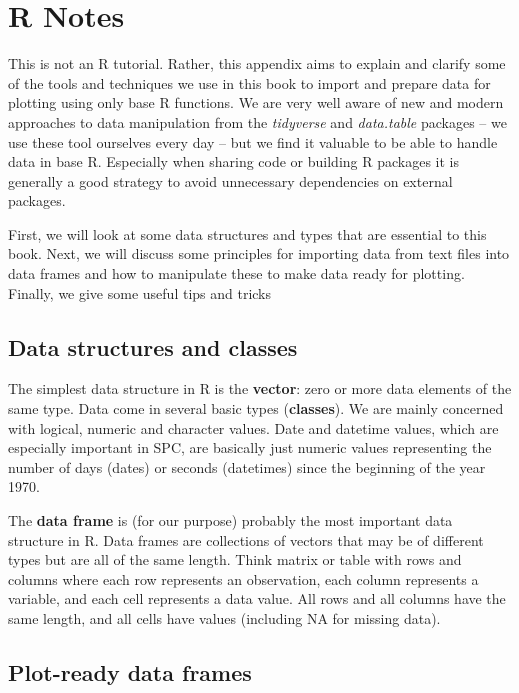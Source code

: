 \documentclass[
]{book}
\begin{document}
\chapter{R Notes}\label{r-notes}

This is not an R tutorial. Rather, this appendix aims to explain and
clarify some of the tools and techniques we use in this book to import
and prepare data for plotting using only base R functions. We are very
well aware of new and modern approaches to data manipulation from the
\emph{tidyverse} and \emph{data.table} packages -- we use these tool
ourselves every day -- but we find it valuable to be able to handle data
in base R. Especially when sharing code or building R packages it is
generally a good strategy to avoid unnecessary dependencies on external
packages.

First, we will look at some data structures and types that are essential
to this book. Next, we will discuss some principles for importing data
from text files into data frames and how to manipulate these to make
data ready for plotting. Finally, we give some useful tips and tricks

\section{Data structures and classes}\label{data-structures-and-classes}

The simplest data structure in R is the \textbf{vector}: zero or more
data elements of the same type. Data come in several basic types
(\textbf{classes}). We are mainly concerned with logical, numeric and
character values. Date and datetime values, which are especially
important in SPC, are basically just numeric values representing the
number of days (dates) or seconds (datetimes) since the beginning of the
year 1970.

The \textbf{data frame} is (for our purpose) probably the most important
data structure in R. Data frames are collections of vectors that may be
of different types but are all of the same length. Think matrix or table
with rows and columns where each row represents an observation, each
column represents a variable, and each cell represents a data value. All
rows and all columns have the same length, and all cells have values
(including NA for missing data).

\section{Plot-ready data frames}\label{plot-ready-data-frames}
\end{document}
